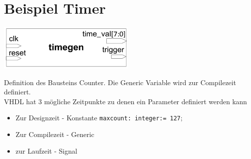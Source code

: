 \section{Beispiel Timer}
\begin{minipage}[]{0.49\textwidth}
\includegraphics[width = 0.5\textwidth]{pics/timegen.png}

Definition des Bausteins Counter. Die Generic Variable wird zur Compilezeit definiert.\\
VHDL hat 3 mögliche Zeitpunkte zu denen ein Parameter definiert werden kann
\begin{itemize}
\itemsep0em
\item Zur Designzeit - Konstante \texttt{maxcount: integer:= 127};
\item Zur Compilezeit - Generic
\item zur Laufzeit - Signal
\end{itemize} 


\end{minipage}
\hfill
\begin{minipage}[]{0.49\textwidth}

\end{minipage}